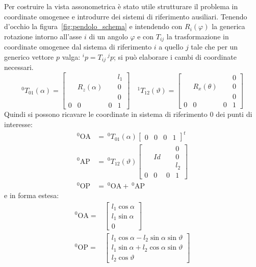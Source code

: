 Per costruire la vista assonometrica \`e stato utile strutturare il problema in coordinate omogenee e introdurre dei sistemi di riferimento ausiliari. Tenendo d'occhio la figura~\ref{fig:pendolo_schema} e intendendo con $R_i(\varphi)$ la generica rotazione intorno all'asse $i$ di un angolo $\varphi$ e con $T_{ij}$ la trasformazione in coordinate omogenee dal sistema di riferimento $i$ a quello $j$ tale che per un generico vettore $p$ valga: $^ip = T_{ij}\ ^j p$; si pu\`o elaborare i cambi di coordinate necessari. 
\begin{equation}
	^0\! T_{01}(\alpha) = \left[ \begin{array}{ccc|c}
	& & & l_1 \\
	& R_z(\alpha) & & 0 \\
	& & & 0 \\
	\hline
	0 & 0 & 0 & 1
	\end{array} \right]
	\quad 
	^1 T_{12}(\vartheta) =
	\left[  \begin{array}{ccc|c}
	& & & 0 \\
	& R_x(\theta) & & 0 \\
	& & & 0 \\
	\hline
	0 & 0 & 0 & 1
	\end{array}
	\right]
\label{eq:cambio_coordinate}
\end{equation}
Quindi si possono ricavare le coordinate in sistema di riferimento $0$ dei punti di interesse:
\begin{equation}
	\begin{aligned}
		^0\! \mathrm{OA}& =\ ^0\!T_{01}(\alpha) \begin{bmatrix} 0& 0 & 0& 1 \end{bmatrix}^t\label{eq:from_punti_in_coord_0} \\
		^0\! \mathrm{AP}& = \ ^0\! T_{12}(\vartheta)
		\left[  \begin{array}{ccc|c}
		& & & 0 \\
		& Id & & 0 \\
		& & & l_2 \\
		\hline
		0 & 0 & 0 & 1
		\end{array}
		\right] \\
		^0\! \mathrm{OP}& = \ ^0\! \mathrm{OA}+\ ^0\! \mathrm{AP}
	\end{aligned}
\end{equation}
e in forma estesa:
\begin{equation}
	\begin{aligned}
	^0\!\mathrm{OA} = &\left[ \begin{array}{c} l_1 \cos\alpha \\ l_1 \sin \alpha \\ 0 \end{array}\right] \\
	^0\!\mathrm{OP} = &\left[ \begin{array}{c} l_1 \cos \alpha - l_2 \sin \alpha \sin \vartheta\\ l_1 \sin \alpha + l_2 \cos \alpha \sin \vartheta\\ l_2 \cos \vartheta \end{array}\right]
	\end{aligned}
\end{equation}
